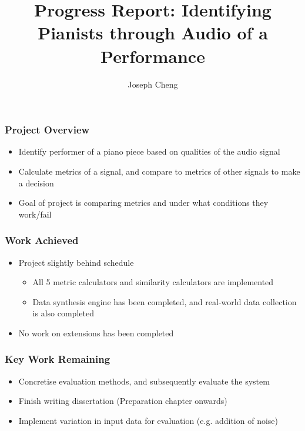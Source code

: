 \documentclass{beamer}
\title{Progress Report: Identifying Pianists through Audio of a Performance}
\author{Joseph Cheng}
\begin{document}
\begin{frame}
    \titlepage
\end{frame}

\begin{frame}
  \frametitle{Project Overview}

  \begin{itemize}
    \item
      Identify performer of a piano piece based on qualities of the audio signal
    \item
      Calculate metrics of a signal, and compare to metrics of other signals to make a decision

    \item
      Goal of project is comparing metrics and under what conditions they work/fail


  \end{itemize}

\end{frame}

\begin{frame}
  \frametitle{Work Achieved}

  \begin{itemize}

    \item
      Project slightly behind schedule

      \begin{itemize}

      \item
        All 5 metric calculators and similarity calculators are implemented

      \item
        Data synthesis engine has been completed, and real-world data collection is also completed
            
      \end{itemize}

    \item
      No work on extensions has been completed


  \end{itemize}

\end{frame}

\begin{frame}
  \frametitle{Key Work Remaining}

  \begin{itemize}

    \item
      Concretise evaluation methods, and subsequently evaluate the system

    \item
      Finish writing dissertation (Preparation chapter onwards)

    \item
      Implement variation in input data for evaluation (e.g. addition of noise)

      
  \end{itemize}

\end{frame}
    
\end{document}
